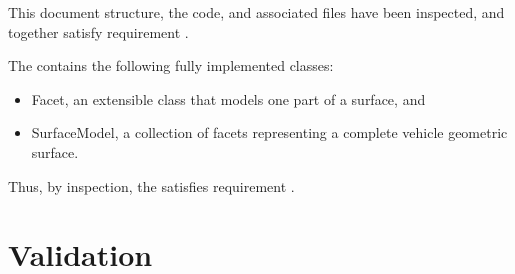 \label{inspect:TLI}
 This document structure, the code, and associated files have been inspected, and together satisfy requirement .

\label{inspect:geo_modeling}

The \ModelDesc contains the following fully implemented classes:

\begin{itemize}
\item{Facet}, an extensible class that models one part of a surface,
and
\item{SurfaceModel}, a collection of facets representing a complete
vehicle geometric surface.
\end{itemize}

Thus, by inspection, the \ModelDesc satisfies
requirement .


\section{Validation}

